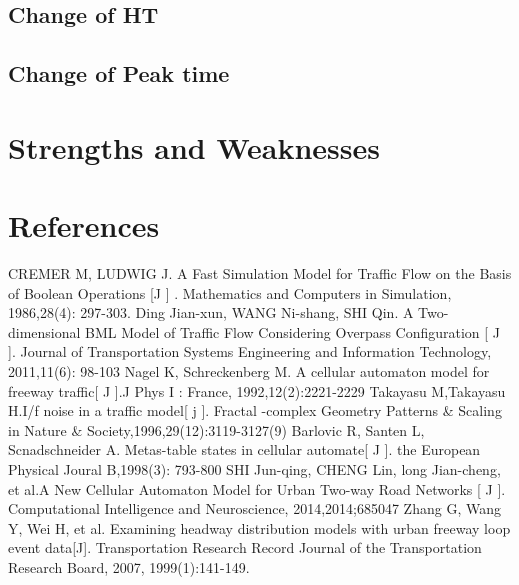 \documentclass{mcmthesis}
\begin{document}
\subsection{Change of HT}

\subsection{Change of Peak time}

\section{Strengths and Weaknesses}


\section{References}
\begin{thebibliography}{99}
CREMER M, LUDWIG J. A Fast Simulation Model for Traffic Flow on the Basis of Boolean Operations [J ] . Mathematics and Computers in Simulation, 1986,28(4): 297-303.
Ding Jian-xun, WANG Ni-shang, SHI Qin. A Two-dimensional BML Model of Traffic Flow Considering Overpass Configuration [ J ]. Journal of Transportation Systems Engineering and Information Technology, 2011,11(6): 98-103
Nagel K, Schreckenberg M. A cellular automaton model for freeway traffic[ J ].J Phys I : France, 1992,12(2):2221-2229
Takayasu M,Takayasu H.I/f  noise in a traffic model[ j ]. Fractal -complex Geometry Patterns \& Scaling in Nature \& Society,1996,29(12):3119-3127(9)
Barlovic R, Santen L, Scnadschneider A. Metas-table states in cellular automate[ J ]. the European Physical Joural B,1998(3): 793-800
SHI Jun-qing, CHENG Lin, long Jian-cheng, et al.A New Cellular Automaton Model for Urban Two-way Road Networks [ J ]. Computational Intelligence and Neuroscience, 2014,2014;685047
Zhang G, Wang Y, Wei H, et al. Examining headway distribution models with urban freeway loop event data[J]. Transportation Research Record Journal of the Transportation Research Board, 2007, 1999(1):141-149.
\end{thebibliography}
\end{document}

